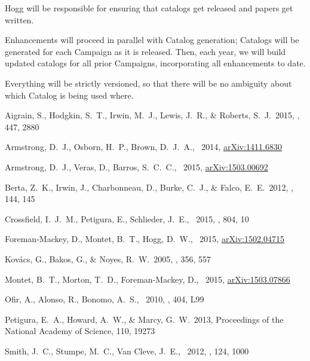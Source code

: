 \documentclass[12pt,preprint]{aastex}
\begin{document}
Hogg will be responsible for ensuring that catalogs get released and
papers get written.

Enhancements will proceed in parallel with Catalog generation;
Catalogs will be generated for each Campaign as it is released.
Then, each year, we will build updated catalogs for all prior
Campaigns, incorporating all enhancements to date.

Everything will be strictly versioned, so that there will be no
ambiguity about which Catalog is being used where.

\clearpage
\newcommand{\arxiv}[1]{{\href{http://arxiv.org/abs/#1}{arXiv:{#1}}}}
\begin{thebibliography}{}\raggedright%

Aigrain, S., Hodgkin, S.~T., Irwin, M.~J., Lewis, J.~R., \& Roberts, S.~J.\
2015, \mnras, 447, 2880

Armstrong, D.~J., Osborn, H.~P., Brown, D.~J.~A., \etal\ 2014,
\arxiv{1411.6830}

Armstrong, D.~J., Veras, D., Barros, S.~C.~C., \etal\ 2015, \arxiv{1503.00692}

Berta, Z.~K., Irwin, J., Charbonneau, D., Burke, C.~J., \& Falco, E.~E.\ 2012,
\aj, 144, 145

Crossfield, I.~J.~M., Petigura, E., Schlieder, J.~E., \etal\ 2015, \apj, 804,
10

Foreman-Mackey, D., Montet, B.~T., Hogg, D.~W., \etal\ 2015, \arxiv{1502.04715}

Kov{\'a}cs, G., Bakos, G., \& Noyes, R.~W.\ 2005, \mnras, 356, 557

Montet, B.~T., Morton, T.~D., Foreman-Mackey, D., \etal\ 2015,
\arxiv{1503.07866}

Ofir, A., Alonso, R., Bonomo, A.~S., \etal\ 2010, \mnras, 404, L99

Petigura, E.~A., Howard, A.~W., \& Marcy, G.~W.\ 2013,
Proceedings of the National Academy of Science, 110, 19273

Smith, J.~C., Stumpe, M.~C., Van Cleve, J.~E., \etal\ 2012, \pasp, 124, 1000


\end{thebibliography}
\end{document}
